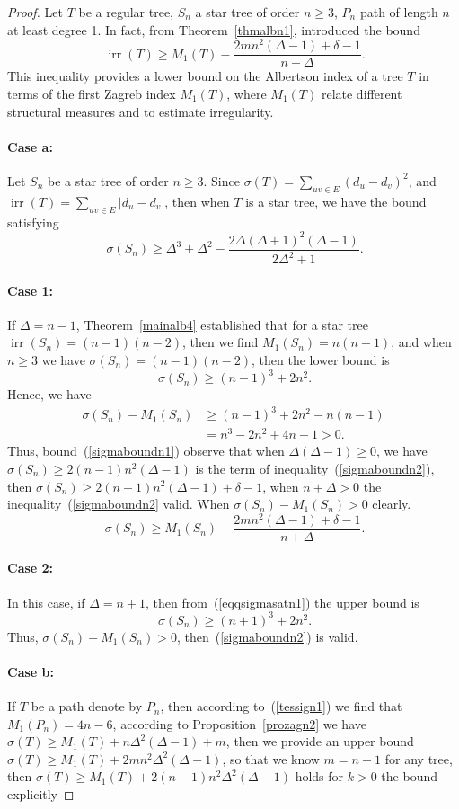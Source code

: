 \documentclass[10pt,a4paper]{amsart}
\newcommand{\case}[1]{\paragraph*{Case #1:}}
\newcommand{\irr}{\operatorname{irr}}
\begin{document}
\begin{proof}
Let $T$ be a regular tree, $S_n$ a star tree of order $n\geq 3$, $P_n$ path of length $n$ at least degree 1. In fact, from Theorem~\ref{thmalbn1}, introduced the bound 
\begin{equation}~\label{tessign1}
\irr(T) \geq M_1(T)  - \frac{2mn^2(\Delta - 1)+\delta-1}{n+\Delta}.
\end{equation}
This inequality provides a lower bound on the Albertson index of a tree $T$ in terms of the first Zagreb index $M_1(T)$, where $M_1(T)$ relate different structural measures and to estimate irregularity. 
\case{a} Let $S_n$ be a star tree of order $n\geq 3$. Since $\sigma(T)=\sum_{uv\in E}(d_u-d_v)^2$, and $\irr(T)=\sum_{uv\in E}\lvert d_u-d_v\rvert$, then when $T$ is a star tree, we have the bound satisfying
\begin{equation}~\label{sigmaboundn1}
    \sigma(S_n) \geq \Delta^3 + \Delta^2 - \frac{2 \Delta (\Delta + 1)^2 (\Delta - 1)}{2\Delta^2 + 1}.
\end{equation}
\case{1} If $\Delta=n-1$, Theorem~\ref{mainalb4} established that for a star tree $\irr(S_n)=(n-1)(n-2)$, then we find $M_1(S_n)=n(n-1)$, and when $n\geq 3$ we have $\sigma(S_n)=(n-1)(n-2)$, then the lower bound is
\begin{equation}~\label{eqqsigmasatn1}
\sigma(S_n) \geq (n-1)^3+2n^2.
\end{equation}
Hence, we have
\begin{align*}
 \sigma(S_n)-M_1(S_n) & \geq (n-1)^3+2n^2-n(n-1)\\
 &=n^3 - 2 n^2 + 4 n - 1>0.
\end{align*}
Thus, bound~(\ref{sigmaboundn1}) observe that when $\Delta(\Delta-1)\geq 0$, we have $\sigma(S_n) \geq 2(n-1)n^2(\Delta - 1)$ is the term of inequality~(\ref{sigmaboundn2}), then $\sigma(S_n) \geq 2(n-1)n^2(\Delta - 1)+\delta-1$, when $n+\Delta>0$ the inequality~(\ref{sigmaboundn2} valid. When $\sigma(S_n)-M_1(S_n)>0$ clearly. 
\begin{equation}~\label{sigmaboundn2}
     \sigma(S_n) \geq M_1(S_n)  - \frac{2mn^2(\Delta - 1)+\delta-1}{n+\Delta}.
\end{equation}
\case{2} In this case, if $\Delta=n+1$, then from~(\ref{eqqsigmasatn1}) the upper bound is 
\begin{equation}~\label{eqqsigmasatn2}
\sigma(S_n) \geq (n+1)^3+2n^2.
\end{equation}
Thus, $\sigma(S_n)-M_1(S_n)>0$, then~(\ref{sigmaboundn2}) is valid.
\case{b} If $T$ be a path denote by $P_n$, then according to~(\ref{tessign1}) we find that $ M_1(P_n) = 4n - 6$, according to Proposition~\ref{prozagn2} we have $\sigma(T)\geq M_1(T)+n\Delta^2(\Delta-1)+m$, then we provide an upper bound $\sigma(T)\geq M_1(T)+2mn^2\Delta^2(\Delta-1)$, so that we know $m=n-1$ for any tree, then $\sigma(T)\geq M_1(T)+2(n-1)n^2\Delta^2(\Delta-1)$ holds for $k>0$ the bound explicitly

\end{proof}
\end{document}
